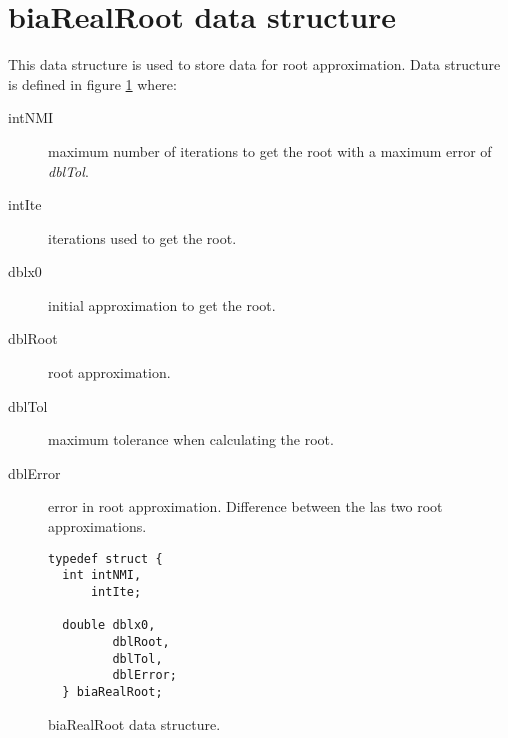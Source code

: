 \section{\textbf{biaRealRoot} data structure} \label{sec:biaRealRoot}

This data structure is used to store data for root approximation. Data structure is defined in figure \ref{fig:biaRealRoot} where:

\begin{description}
\item[intNMI] maximum number of iterations to get the root with a maximum error of \emph{dblTol}.
\item[intIte] iterations used to get the root.
\item[dblx0] initial approximation to get the root.
\item[dblRoot] root approximation.
\item[dblTol] maximum tolerance when calculating the root.
\item[dblError] error in root approximation. Difference between the las two root approximations.
\end{description}

\begin{figure}[!h]
\begin{verbatim}
typedef struct {
  int intNMI,
      intIte;

  double dblx0,
         dblRoot,
         dblTol,
         dblError;
  } biaRealRoot;
\end{verbatim}
\caption{biaRealRoot data structure.} \label{fig:biaRealRoot}
\end{figure}

\FloatBarrier
